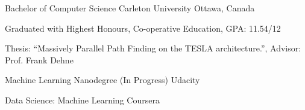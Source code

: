 


\begin{cventries}


\cventry
{Bachelor of Computer Science} %
{Carleton University} %
{Ottawa, Canada} %
{} %
{ %
\begin{cvitems}
  \item {Graduated with Highest Honours, Co-operative Education, GPA: 11.54/12} 
  \item {Thesis: ``Massively Parallel Path Finding on the TESLA architecture.'', Advisor: Prof. Frank Dehne}
\end{cvitems}
}

\vspace{-3ex}
\cventry
{Machine Learning Nanodegree (In Progress)} %
{Udacity} %
{} %
{} %
{ %
}

\vspace{-4ex}
\cventry
{Data Science: Machine Learning} %
{Coursera} %
{} %
{} %
{ %
}
\vspace{-4ex}

\end{cventries}